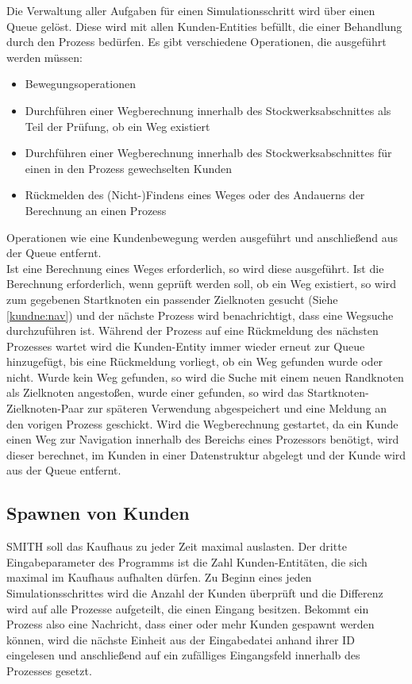 Die Verwaltung aller Aufgaben für einen Simulationsschritt wird über einen Queue gelöst. Diese wird mit allen Kunden-Entities befüllt, die einer Behandlung durch den Prozess bedürfen.
Es gibt verschiedene Operationen, die ausgeführt werden müssen:
\begin{itemize}
\item Bewegungsoperationen
\item Durchführen einer Wegberechnung innerhalb des Stockwerksabschnittes als Teil der Prüfung, ob ein Weg existiert
\item Durchführen einer Wegberechnung innerhalb des Stockwerksabschnittes für einen in den Prozess gewechselten Kunden
\item Rückmelden des (Nicht-)Findens eines Weges oder des Andauerns der Berechnung an einen Prozess
\end{itemize}
Operationen wie eine Kundenbewegung werden ausgeführt und anschließend aus der Queue entfernt.\\
Ist eine Berechnung eines Weges erforderlich, so wird diese ausgeführt. Ist die Berechnung erforderlich, wenn geprüft werden soll, ob ein Weg existiert, so wird zum gegebenen Startknoten ein passender Zielknoten gesucht (Siehe \ref{kundne:nav}) und der nächste Prozess wird benachrichtigt, dass eine Wegsuche durchzuführen ist. Während der Prozess auf eine Rückmeldung des nächsten Prozesses wartet wird die Kunden-Entity immer wieder erneut zur Queue hinzugefügt, bis eine Rückmeldung vorliegt, ob ein Weg gefunden wurde oder nicht. Wurde kein Weg gefunden, so wird die Suche mit einem neuen Randknoten als Zielknoten angestoßen, wurde einer gefunden, so wird das Startknoten-Zielknoten-Paar zur späteren Verwendung abgespeichert und eine Meldung an den vorigen Prozess geschickt. Wird die Wegberechnung gestartet, da ein Kunde einen Weg zur Navigation innerhalb des Bereichs eines Prozessors benötigt, wird dieser berechnet, im Kunden in einer Datenstruktur abgelegt und der Kunde wird aus der Queue entfernt.

\subsection{Spawnen von Kunden}
SMITH soll das Kaufhaus zu jeder Zeit maximal auslasten. Der dritte Eingabeparameter des Programms ist die Zahl Kunden-Entitäten, die sich maximal im Kaufhaus aufhalten dürfen. Zu Beginn eines jeden Simulationsschrittes wird die Anzahl der Kunden überprüft und die Differenz wird auf alle Prozesse aufgeteilt, die einen Eingang besitzen. Bekommt ein Prozess also eine Nachricht, dass einer oder mehr Kunden gespawnt werden können, wird die nächste Einheit aus der Eingabedatei anhand ihrer ID eingelesen und anschließend auf ein zufälliges Eingangsfeld innerhalb des Prozesses gesetzt.

